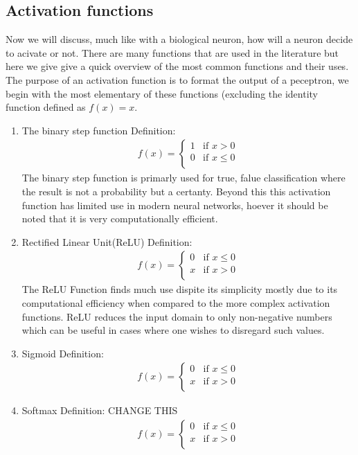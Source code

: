 \documentclass{article}
\begin{document}
\subsection{Activation functions}
Now we will discuss, much like with a biological neuron, how will a neuron decide to acivate or not. There are many functions that are used in the literature but here we give give a quick overview of the most common functions and their uses. The purpose of an activation function is to format the output of a peceptron, we begin with the most elementary of these functions (excluding the identity function defined as $f(x) = x$. 
\begin{enumerate}
\item The binary step function 
Definition:
\begin{align*}
f(x) = 
\begin{cases}
 1 & \text{if } x > 0 \\
 0 & \text{if } x \leq 0 \\
\end{cases}
\end{align*}
The binary step function is primarly used for true, falue classification where the result is not a probability but a certanty. Beyond this this activation function has limited use in modern neural networks, hoever it should be noted that it is very computationally efficient. 
\item Rectified Linear Unit(ReLU)
Definition: 
\begin{align*}
f(x) =
\begin{cases}
 0 & \text{if } x \leq 0 \\
 x & \text{if } x > 0 \\
\end{cases}
\end{align*}
The ReLU Function finds much use dispite its simplicity mostly due to its computational efficiency when compared to the more complex activation functions. ReLU reduces the input domain to only non-negative numbers which can be useful in cases where one wishes to disregard such values. 
\item Sigmoid
Definition: 
\begin{align*}
f(x) =
\begin{cases}
 0 & \text{if } x \leq 0 \\
 x & \text{if } x > 0 \\
\end{cases}
\end{align*}
\item Softmax
Definition: CHANGE THIS
\begin{align*}
f(x) =
\begin{cases}
 0 & \text{if } x \leq 0 \\
 x & \text{if } x > 0 \\
\end{cases}
\end{align*}

\end{enumerate}
\end{document}
